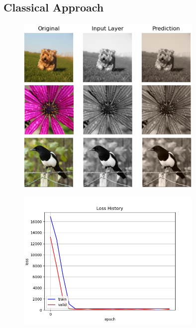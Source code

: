 \documentclass[12pt,letterpaper]{article}
\begin{document}
\subsection{Classical Approach}
\begin{figure}
	\centering
	\includegraphics[width=0.8\textwidth]{class_predict.png}
	\caption{}
	\label{class}
\end{figure}

\begin{figure}[h!]
	\centering
	\includegraphics[width=0.8\textwidth]{loss_classical.png}
	\caption{}
	\label{loss_class}
\end{figure}
\end{document}
